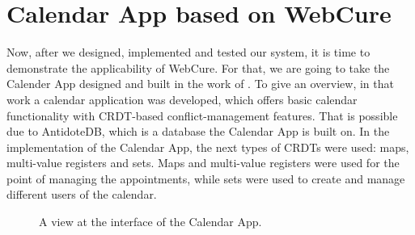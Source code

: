 \section{Calendar App based on WebCure}

Now, after we designed, implemented and tested our system, it is time to demonstrate the applicability of WebCure. For that, we are going to take the Calender App designed and built in the work of \citet{54}. To give an overview, in that work a calendar application was developed, which offers basic calendar functionality with CRDT-based conflict-management features. That is possible due to AntidoteDB, which is a database the Calendar App is built on. In the implementation of the Calendar App, the next types of CRDTs were used: maps, multi-value registers and sets. Maps and multi-value registers were used for the point of managing the appointments, while sets were used to create and manage different users of the calendar. 

\begin{figure}[!htb]
    \begin{center}
    \setlength{\fboxsep}{4pt}%
    \setlength{\fboxrule}{1pt}%
    {\scriptsize%
     }
    \caption {A view at the interface of the Calendar App.}
    \label{fig:ev-fig-1}
\end{center}
\end{figure}

